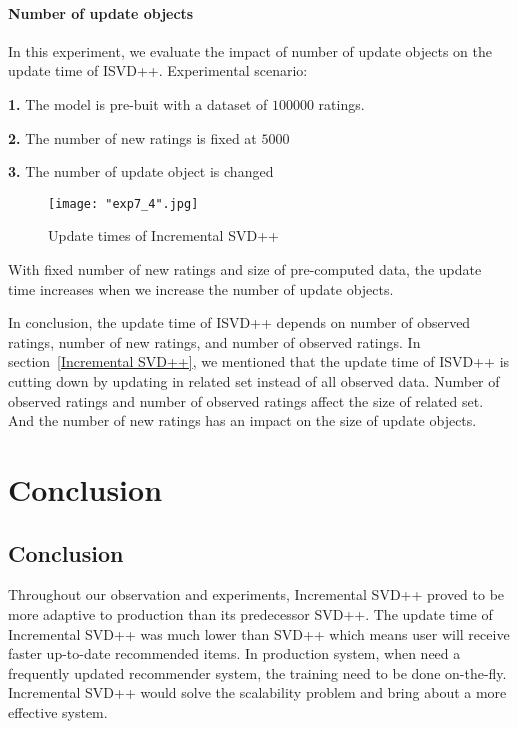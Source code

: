 \documentclass[oneside,13pt]{extreport}
\begin{document}
\subsubsection{Number of update objects}
In this experiment, we evaluate the impact of number of update objects on the update time of ISVD++. Experimental scenario: 
\begin{description}
    \item{\textbf{1.}} The model is pre-buit with a dataset of $100000$ ratings.
    \item{\textbf{2.}} The number of new ratings is fixed at $5000$
    \item{\textbf{3.}} The number of update object is changed
\end{description}

\begin{figure}[h!]
    \centering
    \texttt{[image: "exp7\_4".jpg]} 
    \caption{ Update times of Incremental SVD++}
    \label{fig:exp7_4}
\end{figure}
With fixed number of new ratings and size of pre-computed data, the update time increases when we increase the number of update objects. 

In conclusion, the update time of ISVD++ depends on number of observed ratings, number of new ratings, and number of observed ratings. In section~\ref{Incremental SVD++}, we mentioned  that the update time of ISVD++ is cutting down by updating in related set instead of all observed data. Number of observed ratings and number of observed ratings affect the size of related set. And the number of new ratings has an impact on the size of update objects.


\clearpage
\chapter{Conclusion}
\label{Conclusion}
\section{Conclusion}
Throughout our observation and experiments, Incremental SVD++ proved to be more adaptive to production than its predecessor SVD++. The update time of Incremental SVD++ was much lower than SVD++ which means user will receive faster up-to-date recommended items. In production system, when need a frequently updated recommender system, the training need to be done on-the-fly. Incremental SVD++ would solve the scalability problem and bring about a more effective system.
\end{document}
